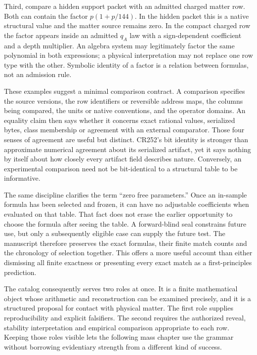 Third, compare a hidden support packet with an admitted charged matter row. Both can contain the factor $p(1+p/144)$. In the hidden packet this is a native structural value and the matter source remains zero. In the compact charged row the factor appears inside an admitted $q_A$ law with a sign-dependent coefficient and a depth multiplier. An algebra system may legitimately factor the same polynomial in both expressions; a physical interpretation may not replace one row type with the other. Symbolic identity of a factor is a relation between formulas, not an admission rule.

These examples suggest a minimal comparison contract. A comparison specifies the source versions, the row identifiers or reversible address maps, the columns being compared, the units or native conventions, and the operator domains. An equality claim then says whether it concerns exact rational values, serialized bytes, class membership or agreement with an external comparator. Those four senses of agreement are useful but distinct. CR252's bit identity is stronger than approximate numerical agreement about its serialized artifact, yet it says nothing by itself about how closely every artifact field describes nature. Conversely, an experimental comparison need not be bit-identical to a structural table to be informative.

The same discipline clarifies the term ``zero free parameters.'' Once an in-sample formula has been selected and frozen, it can have no adjustable coefficients when evaluated on that table. That fact does not erase the earlier opportunity to choose the formula after seeing the table. A forward-blind seal constrains future use, but only a subsequently eligible case can supply the future test. The manuscript therefore preserves the exact formulas, their finite match counts and the chronology of selection together. This offers a more useful account than either dismissing all finite exactness or presenting every exact match as a first-principles prediction.

The catalog consequently serves two roles at once. It is a finite mathematical object whose arithmetic and reconstruction can be examined precisely, and it is a structured proposal for contact with physical matter. The first role supplies reproducibility and explicit falsifiers. The second requires the authorized reveal, stability interpretation and empirical comparison appropriate to each row. Keeping those roles visible lets the following mass chapter use the grammar without borrowing evidentiary strength from a different kind of success.

